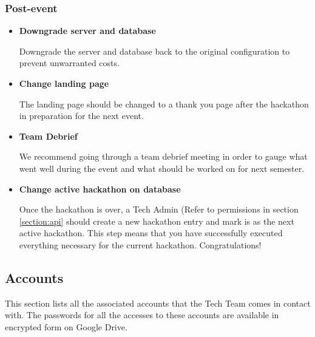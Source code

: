 \documentclass[twoside, 12pt]{article}
\newenvironment{tightitemize} %
{\begin{itemize}\itemsep1pt \parskip0pt \parsep0pt}
{\end{itemize}\vspace{-\topsep}}
\begin{document}
\subsubsection{Post-event}
\begin{tightitemize}
    \item \textbf{Downgrade server and database}
    \par Downgrade the server and database back to the original configuration to prevent unwarranted costs.
    
    \item \textbf{Change landing page}
    \par The landing page should be changed to a thank you page after the hackathon in preparation for the next event.
    
    \item \textbf{Team Debrief}
    \par We recommend going through a team debrief meeting in order to gauge what went well during the event and what should be worked on for next semester.
    
    \item \textbf{Change active hackathon on database}
    \par Once the hackathon is over, a Tech Admin (Refer to permissions in section \ref{section:api} should create a new hackathon entry and mark is as the next active hackathon. This step means that you have successfully executed everything necessary for the current hackathon. Congratulations!
\end{tightitemize}
\subsection{Accounts}
\par This section lists all the associated accounts that the Tech Team comes in contact with. The passwords for all the accesses to these accounts are available in encrypted form on Google Drive.
\end{document}

